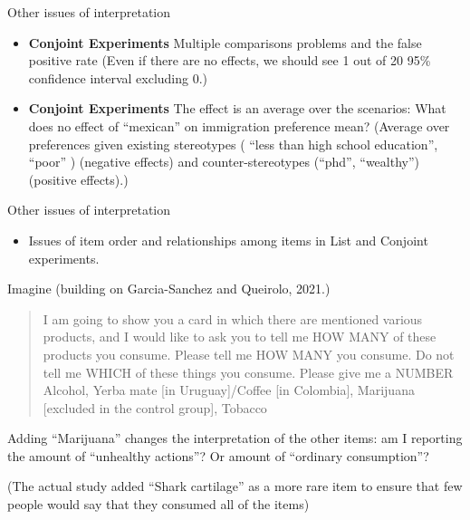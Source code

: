\documentclass[
  ignorenonframetext,
]{beamer}
\providecommand{\tightlist}{%
  \setlength{\itemsep}{0pt}\setlength{\parskip}{0pt}}
\begin{document}
\begin{frame}[allowframebreaks]{Other issues of interpretation}
\protect\hypertarget{other-issues-of-interpretation-1}{}
\begin{itemize}
\tightlist
\item
  \textbf{Conjoint Experiments} Multiple comparisons problems and the
  false positive rate (Even if there are no effects, we should see 1 out
  of 20 95\% confidence interval excluding 0.)
\item
  \textbf{Conjoint Experiments} The effect is an average over the
  scenarios: What does no effect of ``mexican'' on immigration
  preference mean? (Average over preferences given existing stereotypes
  ( ``less than high school education'', ``poor'' ) (negative effects)
  and counter-stereotypes (``phd'', ``wealthy'') (positive effects).)
\end{itemize}
\end{frame}

\begin{frame}[allowframebreaks]{Other issues of interpretation}
\protect\hypertarget{other-issues-of-interpretation-2}{}
\begin{itemize}
\tightlist
\item
  Issues of item order and relationships among items in List and
  Conjoint experiments.
\end{itemize}

Imagine (building on Garcia-Sanchez and Queirolo, 2021.)

\begin{quote}
I am going to show you a card in which there are mentioned various
products, and I would like to ask you to tell me HOW MANY of these
products you consume. Please tell me HOW MANY you consume. Do not tell
me WHICH of these things you consume. Please give me a NUMBER Alcohol,
Yerba mate {[}in Uruguay{]}/Coffee {[}in Colombia{]}, Marijuana
{[}excluded in the control group{]}, Tobacco
\end{quote}

Adding ``Marijuana'' changes the interpretation of the other items: am I
reporting the amount of ``unhealthy actions''? Or amount of ``ordinary
consumption''?

(The actual study added ``Shark cartilage'' as a more rare item to
ensure that few people would say that they consumed all of the items)
\end{frame}
\end{document}
